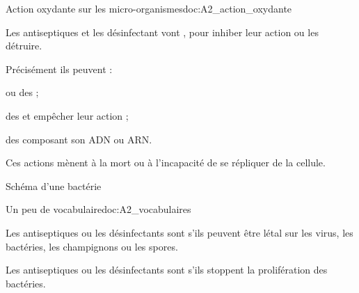 \begin{doc}{Action oxydante sur les micro-organismes}{doc:A2_action_oxydante}
  \begin{importants}  
    Les antiseptiques et les désinfectant vont , pour inhiber leur action ou les détruire.
  \end{importants}

  Précisément ils peuvent :
  \begin{listePoints}
    \item {} ou  des  ;
    \item {} des  et empêcher leur action ;
    \item {} des  composant son ADN ou ARN.
  \end{listePoints}
  Ces actions mènent à la mort ou à l'incapacité de se répliquer de la cellule.
  \begin{center}

    Schéma d'une bactérie
  \end{center}
\end{doc}





\begin{doc}{Un peu de vocabulaire}{doc:A2_vocabulaires}
  \begin{importants}
    Les antiseptiques ou les désinfectants sont  s'ils peuvent être létal sur les virus, les bactéries, les champignons ou les spores.
  \end{importants}

  \begin{importants}
    Les antiseptiques ou les désinfectants sont  s'ils stoppent la prolifération des bactéries.
  \end{importants}
\end{doc}


